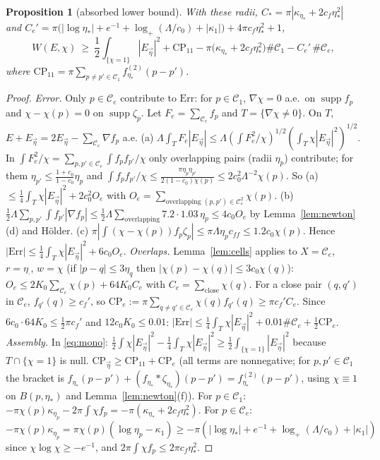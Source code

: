 \documentclass[11pt,reqno]{amsart}
\numberwithin{equation}{section}
\theoremstyle{plain}
\newtheorem{proposition}[theorem]{Proposition}
\theoremstyle{definition}
\newcommand{\supp}{\operatorname{supp}}
\newcommand{\CP}{\mathrm{CP}}
\begin{document}
\begin{proposition}[absorbed lower bound]\label{prop:absorbed}
With these radii, $C_*=\pi|\kappa_{\eta_*}+2c_f\eta_*^2|$ and $C_e'=\pi\big(|\log\eta_*|+e^{-1}+\log_+(\Lambda/c_0)+|\kappa_1|\big)+4\pi c_f\eta_*^2+1$,
\[
W(E,\chi)\ \ge\ \frac12\int_{\{\chi=1\}}|E_{\vec\eta}|^2+\CP_{11}-\pi\big(\kappa_{\eta_*}+2c_f\eta_*^2\big)\#\mathcal C_1-C_e'\,\#\mathcal C_e ,
\]
where $\CP_{11}=\pi\sum_{p\ne p'\in\mathcal C_1}f^{(2)}_{\eta_*}(p-p')$.
\end{proposition}
\begin{proof}
\emph{Error.}  Only $p\in\mathcal C_e$ contribute to $\mathrm{Err}$: for $p\in\mathcal C_1$, $\nabla\chi=0$ a.e.\ on $\supp f_p$ and $\chi-\chi(p)=0$ on $\supp\zeta_p$.  Let $F_e=\sum_{\mathcal C_e}f_p$ and $T=\{\nabla\chi\ne0\}$.  On $T$, $E+E_{\vec\eta}=2E_{\vec\eta}-\sum_{\mathcal C_e}\nabla f_p$ a.e.  (a) $\Lambda\int_TF_e|E_{\vec\eta}|\le\Lambda(\int F_e^2/\chi)^{1/2}(\int_T\chi|E_{\vec\eta}|^2)^{1/2}$.  In $\int F_e^2/\chi=\sum_{p,p'\in\mathcal C_e}\int f_pf_{p'}/\chi$ only overlapping pairs (radii $\eta_p$) contribute; for them $\eta_{p'}\le\frac{1+c_0}{1-c_0}\eta_p$ and $\int f_pf_{p'}/\chi\le\frac{\pi\eta_p\eta_{p'}}{2(1-c_0)\chi(p)}\le2c_0^2\Lambda^{-2}\chi(p)$.  So (a)$\le\frac14\int_T\chi|E_{\vec\eta}|^2+2c_0^2O_e$ with $O_e=\sum_{\text{overlapping }(p,p')\in\mathcal C_e^2}\chi(p)$.  (b) $\frac12\Lambda\sum_{p,p'}\int f_{p'}|\nabla f_p|\le\frac12\Lambda\sum_{\text{overlapping}}7.2\cdot1.03\,\eta_p\le4c_0O_e$ by Lemma~\ref{lem:newton}(d) and Hölder.  (c) $\pi|\int(\chi-\chi(p))f_p\zeta_p|\le\pi\Lambda\eta_pc_{ff}\le1.2c_0\chi(p)$.  Hence $|\mathrm{Err}|\le\frac14\int_T\chi|E_{\vec\eta}|^2+6c_0O_e$.
\emph{Overlaps.}  Lemma~\ref{lem:cells} applies to $X=\mathcal C_e$, $r=\eta_\cdot$, $w=\chi$ (if $|p-q|\le3\eta_q$ then $|\chi(p)-\chi(q)|\le3c_0\chi(q)$): $O_e\le2K_0\sum_{\mathcal C_e}\chi(p)+64K_0C_e$ with $C_e=\sum_{\text{close}}\chi(q)$.  For a close pair $(q,q')$ in $\mathcal C_e$, $f_{q'}(q)\ge c_f'$, so $\CP_e:=\pi\sum_{q\ne q'\in\mathcal C_e}\chi(q)f_{q'}(q)\ge\pi c_f'C_e$.  Since $6c_0\cdot64K_0\le\frac12\pi c_f'$ and $12c_0K_0\le0.01$: $|\mathrm{Err}|\le\frac14\int_T\chi|E_{\vec\eta}|^2+0.01\#\mathcal C_e+\frac12\CP_e$.
\emph{Assembly.}  In \eqref{eq:mono}: $\frac12\int\chi|E_{\vec\eta}|^2-\frac14\int_T\chi|E_{\vec\eta}|^2\ge\frac12\int_{\{\chi=1\}}|E_{\vec\eta}|^2$ because $T\cap\{\chi=1\}$ is null.  $\CP_{\vec\eta}\ge\CP_{11}+\CP_e$ (all terms are nonnegative; for $p,p'\in\mathcal C_1$ the bracket is $f_{\eta_*}(p-p')+(f_{\eta_*}*\zeta_{\eta_*})(p-p')=f^{(2)}_{\eta_*}(p-p')$, using $\chi\equiv1$ on $B(p,\eta_*)$ and Lemma~\ref{lem:newton}(f)).  For $p\in\mathcal C_1$: $-\pi\chi(p)\kappa_{\eta_p}-2\pi\int\chi f_p=-\pi(\kappa_{\eta_*}+2c_f\eta_*^2)$.  For $p\in\mathcal C_e$: $-\pi\chi(p)\kappa_{\eta_p}=\pi\chi(p)(\log\eta_p-\kappa_1)\ge-\pi(|\log\eta_*|+e^{-1}+\log_+(\Lambda/c_0)+|\kappa_1|)$ since $\chi\log\chi\ge-e^{-1}$, and $2\pi\int\chi f_p\le2\pi c_f\eta_*^2$.
\end{proof}
\end{document}

